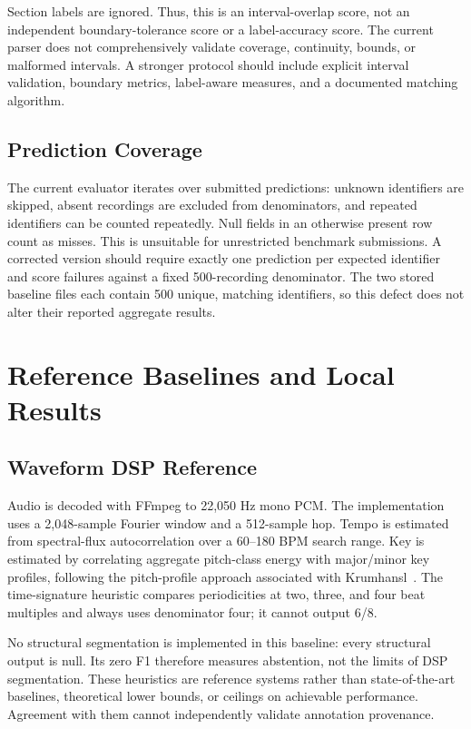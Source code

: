 \documentclass[11pt,a4paper]{article}
\begin{document}
Section labels are ignored. Thus, this is an interval-overlap score, not an independent boundary-tolerance score or a label-accuracy score. The current parser does not comprehensively validate coverage, continuity, bounds, or malformed intervals. A stronger protocol should include explicit interval validation, boundary metrics, label-aware measures, and a documented matching algorithm.

\subsection{Prediction Coverage}
The current evaluator iterates over submitted predictions: unknown identifiers are skipped, absent recordings are excluded from denominators, and repeated identifiers can be counted repeatedly. Null fields in an otherwise present row count as misses. This is unsuitable for unrestricted benchmark submissions. A corrected version should require exactly one prediction per expected identifier and score failures against a fixed 500-recording denominator. The two stored baseline files each contain 500 unique, matching identifiers, so this defect does not alter their reported aggregate results.

\section{Reference Baselines and Local Results}
\label{sec:baselines}
\subsection{Waveform DSP Reference}
Audio is decoded with FFmpeg to 22,050 Hz mono PCM. The implementation uses a 2,048-sample Fourier window and a 512-sample hop. Tempo is estimated from spectral-flux autocorrelation over a 60--180 BPM search range. Key is estimated by correlating aggregate pitch-class energy with major/minor key profiles, following the pitch-profile approach associated with Krumhansl~\cite{krumhansl}. The time-signature heuristic compares periodicities at two, three, and four beat multiples and always uses denominator four; it cannot output 6/8.

No structural segmentation is implemented in this baseline: every structural output is null. Its zero F1 therefore measures abstention, not the limits of DSP segmentation. These heuristics are reference systems rather than state-of-the-art baselines, theoretical lower bounds, or ceilings on achievable performance. Agreement with them cannot independently validate annotation provenance.
\end{document}
